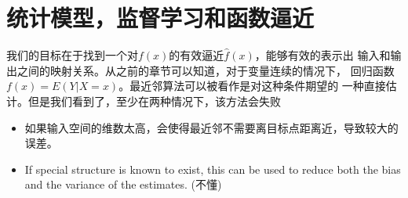 \documentclass[ruled]{article}
\begin{document}
\section{统计模型，监督学习和函数逼近}
我们的目标在于找到一个对$f(x)$的有效逼近$\hat{f}(x)$，能够有效的表示出
输入和输出之间的映射关系。从之前的章节可以知道，对于变量连续的情况下，
回归函数$f(x) = E(Y | X = x)$。最近邻算法可以被看作是对这种条件期望的
一种直接估计。但是我们看到了，至少在两种情况下，该方法会失败
\begin{itemize}
  \item 如果输入空间的维数太高，会使得最近邻不需要离目标点距离近，导致较大的误差。
  \item If special structure is known to exist, this can be used to reduce both the 
  bias and the variance of the estimates. (不懂) 
\end{itemize}
\end{document}
